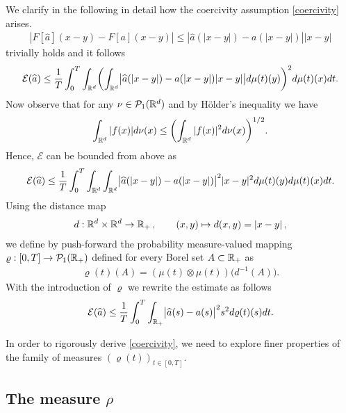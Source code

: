 We clarify in the following in detail how the coercivity assumption \eqref{coercivity} arises.%
\begin{align*}
|F[\widehat a](x-y) - F[a](x-y)|\leq |\widehat a(|x-y|) - a(|x-y|)| |x-y|
\end{align*}
trivially holds and it follows
\begin{align*}
	 \mathcal E(\widehat a)
		\leq\frac{1}{T}\int_0^T\int_{\mathbb{R}^d}\biggl(\int_{\mathbb{R}^d}\bigl|\widehat a(|x-y|)-a(|x-y|) |x-y|\bigr|
			d\mu(t)(y)\biggr)^2 d\mu(t)(x) dt.
\end{align*}
Now observe that for any $\nu\in \mathcal{P}_1(\mathbb{R}^d)$ and  by H\"older's inequality we have
\begin{align*}
	\int_{\mathbb{R}^d}|f(x)|d\nu(x)\leq\biggl(\int_{\mathbb{R}^d}|f(x)|^2 d\nu(x)\biggr)^{1/2}.
\end{align*}
Hence, $\mathcal E$ can be bounded from above as
\begin{align*}
	\mathcal E(\widehat a)\leq\frac{1}{T}\int_0^T\int_{\mathbb{R}^d}\int_{\mathbb{R}^d}\bigl|\widehat a(|x-y|)-a(|x-y|)
		\bigr|^2  |x-y|^2 d\mu(t)(y) d\mu(t)(x) dt.
\end{align*}
Using the distance map
\begin{align*}
	d:\mathbb{R}^d\times\mathbb{R}^d\rightarrow\mathbb{R}_+\,,\qquad (x,y)\mapsto d(x,y)=|x-y|\,,
\end{align*}
we define by push-forward the probability measure-valued mapping $\varrho:[0,T]\rightarrow \mathcal{P}_1(\mathbb{R}_+)$ defined for every Borel set $A\subset\mathbb{R}_+$ as
\begin{align*}
	\varrho(t)(A)=(\mu(t)\otimes\mu(t))\bigl(d^{-1}(A)\bigr).
\end{align*}
With the introduction of $\varrho$ we rewrite the estimate as follows
\begin{align}\label{midpoint}
	\mathcal E(\widehat a)\leq\frac{1}{T}\int_0^T\int_{\mathbb{R}_+}\bigl|\widehat a(s)-a(s)\bigr|^2 s^2d\varrho(t)(s) dt.
\end{align}

In order to rigorously derive \eqref{coercivity}, we need to explore finer properties of the family of measures $(\varrho(t))_{t \in [0,T]}$.

\subsection{The measure $\rho$}

